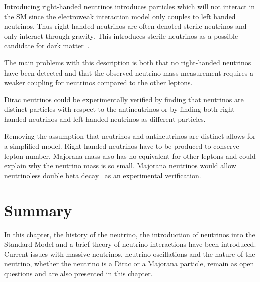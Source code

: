 Introducing right-handed neutrinos introduces particles which will not interact in the SM since the electroweak interaction model only couples to left handed neutrinos. Thus right-handed neutrinos are often denoted sterile neutrinos and only interact through gravity. This introduces sterile neutrinos as a possible candidate for dark matter~\cite{SterileDark, SUSYdark}.

The main problems with this description is both that no right-handed neutrinos have been detected and that the observed neutrino mass measurement requires a weaker coupling for neutrinos compared to the other leptons.

Dirac neutrinos could be experimentally verified by finding that neutrinos are distinct particles with respect to the antineutrinos or by finding both right-handed neutrinos and left-handed neutrinos as different particles.

Removing the assumption that neutrinos and antineutrinos are distinct allows for a simplified model. Right handed neutrinos have to be produced to conserve lepton number. Majorana mass also has no equivalent for other leptons and could explain why the neutrino mass is so small. Majorana neutrinos would allow neutrinoless double beta decay~\cite{NeuLess} as an experimental verification.

\section{Summary}
In this chapter, the history of the neutrino, the introduction of neutrinos into the Standard Model and a brief theory of neutrino interactions have been introduced. Current issues with massive neutrinos, neutrino oscillations and the nature of the neutrino, whether the neutrino is a Dirac or a Majorana particle, remain as open questions and are also presented in this chapter.


%
